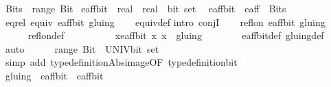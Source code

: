 \begin{isabellebody}
\ {\isachardoublequoteopen}Bits\ {\isacharequal}\ range\ Bit{\isachardoublequoteclose}\isanewline
{}\isamarkupfalse%
\ e{\isacharunderscore}aff{\isacharunderscore}bit\ {\isacharcolon}{\isacharcolon}\ {\isachardoublequoteopen}{\isacharparenleft}{\isacharparenleft}real\ {\isasymtimes}\ real{\isacharparenright}\ {\isasymtimes}\ bit{\isacharparenright}\ set{\isachardoublequoteclose}\ \isanewline
\ {\isachardoublequoteopen}e{\isacharunderscore}aff{\isacharunderscore}bit\ {\isacharequal}\ e{\isacharunderscore}aff\ {\isasymtimes}\ Bits{\isachardoublequoteclose}\isanewline
\isanewline
{}\isamarkupfalse%
\ eq{\isacharunderscore}rel{\isacharcolon}\ {\isachardoublequoteopen}equiv\ e{\isacharunderscore}aff{\isacharunderscore}bit\ gluing{\isachardoublequoteclose}\isanewline
%
\isadelimproof
\ \ %
\endisadelimproof
%
\isatagproof
{}\isamarkupfalse%
\ equiv{\isacharunderscore}def\isanewline
{}\isamarkupfalse%
{\isacharparenleft}intro\ conjI{\isacharparenright}\isanewline
\ \ \isamarkupfalse%
\ {\isachardoublequoteopen}refl{\isacharunderscore}on\ e{\isacharunderscore}aff{\isacharunderscore}bit\ gluing{\isachardoublequoteclose}\isanewline
\ \ \ \ \isamarkupfalse%
\ refl{\isacharunderscore}on{\isacharunderscore}def\isanewline
\ \ \isamarkupfalse%
\ \isanewline
\ \ \ \ \isamarkupfalse%
\ {\isachardoublequoteopen}{\isacharparenleft}{\isasymforall}x{\isasymin}e{\isacharunderscore}aff{\isacharunderscore}bit{\isachardot}\ {\isacharparenleft}x{\isacharcomma}\ x{\isacharparenright}\ {\isasymin}\ gluing{\isacharparenright}{\isachardoublequoteclose}\isanewline
\ \ \ \ \ \ \isamarkupfalse%
\ e{\isacharunderscore}aff{\isacharunderscore}bit{\isacharunderscore}def\ gluing{\isacharunderscore}def\ \isamarkupfalse%
\ auto\isanewline
\ \ \ \ \isamarkupfalse%
\ {\isachardoublequoteopen}range\ Bit\ {\isacharequal}\ {\isacharparenleft}UNIV{\isacharcolon}{\isacharcolon}bit\ set{\isacharparenright}{\isachardoublequoteclose}\ \isanewline
\ \ \ \ \ \ \isamarkupfalse%
\ {\isacharparenleft}simp\ add{\isacharcolon}\ type{\isacharunderscore}definition{\isachardot}Abs{\isacharunderscore}image{\isacharbrackleft}OF\ type{\isacharunderscore}definition{\isacharunderscore}bit{\isacharbrackright}{\isacharparenright}\ \isanewline
\ \ \ \ \isamarkupfalse%
\ {\isachardoublequoteopen}gluing\ {\isasymsubseteq}\ e{\isacharunderscore}aff{\isacharunderscore}bit\ {\isasymtimes}\ e{\isacharunderscore}aff{\isacharunderscore}bit{\isachardoublequoteclose}\ \isanewline

\end{isabellebody}
